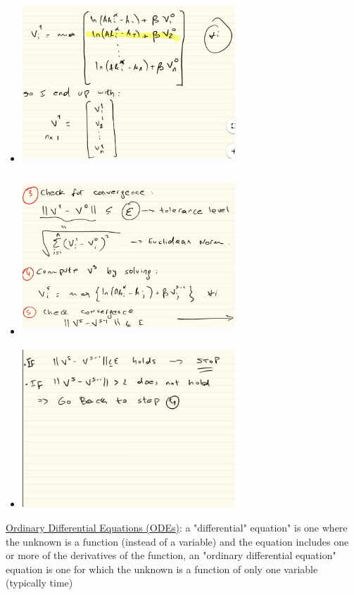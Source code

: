 \documentclass{article}
\begin{document}
\begin{itemize}
\begin{itemize}
\begin{itemize}
            \item \includegraphics[width=8cm, height=6cm]{pic2}
            \item \includegraphics[width=8cm, height=6cm]{pic3}
            \item \includegraphics[width=8cm, height=6cm]{pic4}
        \end{itemize}
    \end{itemize}
\end{itemize}
\par \underline{Ordinary Differential Equations (ODEs)}: a "differential" equation" is one where the unknown is a function (instead of a variable) and the equation includes one or more of the derivatives of the function, an "ordinary differential equation" equation is one for which the unknown is a function of only one variable (typically time)
\end{document}
